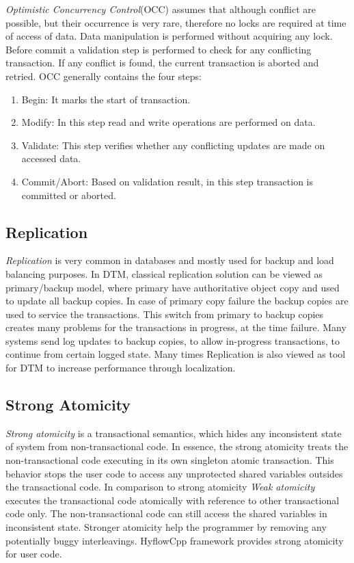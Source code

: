 \documentclass[12pt,english]{report}
\begin{document}
\textit{Optimistic Concurrency Control}(OCC) assumes that although conflict are possible, but their occurrence is very rare, therefore no locks are required at time of access of data. Data manipulation is performed without acquiring any lock. Before commit a validation step is performed to check for any conflicting transaction. If any conflict is found, the current transaction is aborted and retried. OCC generally contains the four steps:

\begin{enumerate}
\item Begin: It marks the start of transaction.
\item Modify: In this step read and write operations are performed on data.
\item Validate: This step verifies whether any conflicting updates are made on accessed data.
\item Commit/Abort: Based on validation result, in this step transaction is committed or aborted.
\end{enumerate}   

\subsection{Replication}

\textit{Replication} is very common in databases and mostly used for backup and load balancing purposes. In DTM, classical replication solution can be viewed as primary/backup model, where primary have authoritative object copy and used to update all backup copies. In case of primary copy failure the backup copies are used to service the transactions. This switch from primary to backup copies creates many problems for the transactions in progress, at the time failure. Many systems send log updates to backup copies, to allow in-progress transactions, to continue from certain logged state. Many times Replication is also viewed as tool for DTM to increase performance through localization.

\subsection{Strong Atomicity}

\textit{Strong atomicity} is a transactional semantics, which hides any inconsistent state of system from non-transactional code. In essence, the strong atomicity treats the non-transactional code executing in its own singleton atomic transaction. This behavior stops the user code to access any unprotected shared variables outsides the transactional code. In comparison to strong atomicity \textit{ Weak atomicity} executes the transactional code atomically with reference to other transactional code only. The non-transactional code can still access the shared variables in inconsistent state. Stronger atomicity help the programmer by removing any potentially buggy interleavings. HyflowCpp framework provides strong atomicity for user code.     
\end{document}
